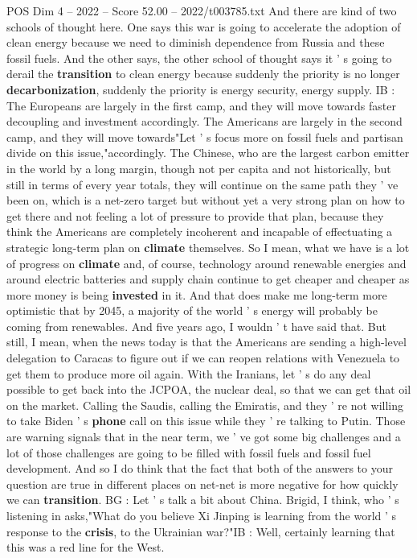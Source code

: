 \begin{textsample}{POS Dim 4 – 2022 – Score 52.00 – 2022/t003785.txt}
And there are kind of two schools of thought here.
One says this war is going to accelerate the adoption of clean energy because we need to diminish dependence from Russia and these fossil fuels.
And the other says, the other school of thought says it ' s going to derail the \textbf{transition} to clean energy because suddenly the priority is no longer \textbf{decarbonization}, suddenly the priority is energy security, energy supply.
IB : The Europeans are largely in the first camp, and they will move towards faster decoupling and investment accordingly.
The Americans are largely in the second camp, and they will move towards"Let ' s focus more on fossil fuels and partisan divide on this issue,"accordingly.
The Chinese, who are the largest carbon emitter in the world by a long margin, though not per capita and not historically, but still in terms of every year totals, they will continue on the same path they ' ve been on, which is a net-zero target but without yet a very strong plan on how to get there and not feeling a lot of pressure to provide that plan, because they think the Americans are completely incoherent and incapable of effectuating a strategic long-term plan on \textbf{climate} themselves.
So I mean, what we have is a lot of progress on \textbf{climate} and, of course, technology around renewable energies and around electric batteries and supply chain continue to get cheaper and cheaper as more money is being \textbf{invested} in it.
And that does make me long-term more optimistic that by 2045, a majority of the world ' s energy will probably be coming from renewables.
And five years ago, I wouldn ' t have said that.
But still, I mean, when the news today is that the Americans are sending a high-level delegation to Caracas to figure out if we can reopen relations with Venezuela to get them to produce more oil again.
With the Iranians, let ' s do any deal possible to get back into the JCPOA, the nuclear deal, so that we can get that oil on the market.
Calling the Saudis, calling the Emiratis, and they ' re not willing to take Biden ' s \textbf{phone} call on this issue while they ' re talking to Putin.
Those are warning signals that in the near term, we ' ve got some big challenges and a lot of those challenges are going to be filled with fossil fuels and fossil fuel development.
And so I do think that the fact that both of the answers to your question are true in different places on net-net is more negative for how quickly we can \textbf{transition}.
BG : Let ' s talk a bit about China.
Brigid, I think, who ' s listening in asks,"What do you believe Xi Jinping is learning from the world ' s response to the \textbf{crisis}, to the Ukrainian war?"IB : Well, certainly learning that this was a red line for the West.

\end{textsample}
